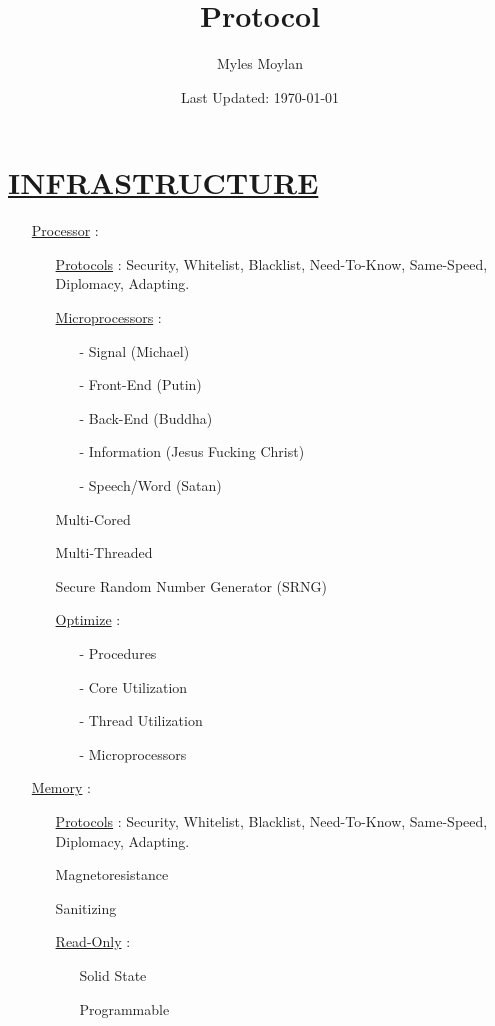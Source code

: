 \documentclass[11pt]{article}
\title{	
	\normalfont \normalsize 
	\huge Protocol
}
\author{Myles Moylan}
\date{Last Updated: \normalsize\today}
\begin{document}
\maketitle
\section*{\ul{INFRASTRUCTURE}}
\begin{enumerate}
	
	\item[] \ul{Processor} :
	\begin{enumerate}
		\item[] \ul{Protocols} : Security, Whitelist, Blacklist, Need-To-Know, Same-Speed, Diplomacy,  Adapting.
		\item[] \ul{Microprocessors} :
		\begin{enumerate}
			\item[-] Signal (Michael)
			\item[-] Front-End (Putin)
			\item[-] Back-End (Buddha)
			\item[-] Information (Jesus Fucking Christ)
			\item[-] Speech/Word (Satan)
		\end{enumerate}
		\item[] Multi-Cored
		\item[] Multi-Threaded
		\item[] Secure Random Number Generator (SRNG)
		\item[] \ul{Optimize}  :
		\begin{enumerate}
			\item[-] Procedures
			\item[-] Core Utilization
			\item[-] Thread Utilization
			\item[-] Microprocessors
		\end{enumerate}
	\end{enumerate}
	
	\item[] \ul{Memory} :
	\begin{enumerate}
		\item[] \ul{Protocols} : Security, Whitelist, Blacklist, Need-To-Know, Same-Speed, Diplomacy,  Adapting.
		\item[] Magnetoresistance
		\item[] Sanitizing
		
		\item[] \ul{Read-Only} :
		\begin{enumerate}
			\item[] Solid State
			\item[] Programmable
		\end{enumerate}
	

\end{enumerate}
\end{enumerate}
\end{document}
